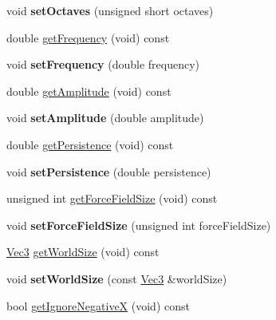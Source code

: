 \begin{DoxyCompactItemize}
\item 
\mbox{\label{classPUForceFieldAffector_afbd77a5d6dfff4a119cb0dae3d57d9c3}} 
void {\bfseries set\+Octaves} (unsigned short octaves)
\item 
double \hyperlink{classPUForceFieldAffector_adc1d9ef5cbe2329ecf1a89757134631a}{get\+Frequency} (void) const
\item 
\mbox{\label{classPUForceFieldAffector_a025c1c7dacdca2c7475cf96cdef388c2}} 
void {\bfseries set\+Frequency} (double frequency)
\item 
double \hyperlink{classPUForceFieldAffector_afa886069dc011c0a6d360f93e55c0f7c}{get\+Amplitude} (void) const
\item 
\mbox{\label{classPUForceFieldAffector_a267a08c9345d49a10306513451ef23b5}} 
void {\bfseries set\+Amplitude} (double amplitude)
\item 
double \hyperlink{classPUForceFieldAffector_a48bbf6a6a218e95b0ffe72a04e029c0f}{get\+Persistence} (void) const
\item 
\mbox{\label{classPUForceFieldAffector_a51a93728ef1098cdb671771b98eeacaa}} 
void {\bfseries set\+Persistence} (double persistence)
\item 
unsigned int \hyperlink{classPUForceFieldAffector_a2881115258d19390c08cc9f497d0eba4}{get\+Force\+Field\+Size} (void) const
\item 
\mbox{\label{classPUForceFieldAffector_a7996df6e166f012029950b46899bbcf0}} 
void {\bfseries set\+Force\+Field\+Size} (unsigned int force\+Field\+Size)
\item 
\hyperlink{classVec3}{Vec3} \hyperlink{classPUForceFieldAffector_a18fdf0379566ff0add7fca6287a930c3}{get\+World\+Size} (void) const
\item 
\mbox{\label{classPUForceFieldAffector_a46716d2924a298446c1fe78780c69145}} 
void {\bfseries set\+World\+Size} (const \hyperlink{classVec3}{Vec3} \&world\+Size)
\item 
bool \hyperlink{classPUForceFieldAffector_a8ea01b32511213bfff8496bf05369dde}{get\+Ignore\+NegativeX} (void) const
\item 
\mbox{\label{classPUForceFieldAffector_a7ad3107c85af62b7ba78639359874ff6}} 

\end{DoxyCompactItemize}
